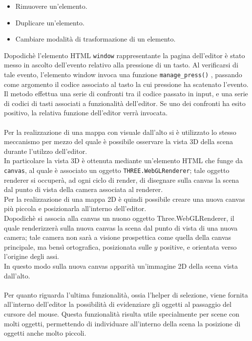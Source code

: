 \begin{itemize}
\item Rimuovere un’elemento.
\item Duplicare un’elemento.
\item Cambiare modalità di trasformazione di un elemento.
\end{itemize}
Dopodichè l’elemento HTML \texttt{window} rappresentante la pagina dell’editor è stato messo in ascolto dell’evento relativo alla pressione di un tasto. Al verificarsi di tale evento, l’elemento window invoca una funzione \texttt{manage\_press()} , passando come argomento il codice associato al tasto la cui pressione ha scatenato l’evento. Il metodo effettua una serie di confronti tra il codice passato in input, e una serie di codici di tasti associati a funzionalità dell’editor. Se uno dei confronti ha esito positivo, la relativa funzione dell’editor verrà invocata.
\\
\\
Per la realizzazione di una mappa con visuale dall’alto si è utilizzato lo stesso meccanismo per mezzo del quale è possibile osservare la vista 3D della scena durante l’utilzzo dell’editor.
\\
In particolare la vista 3D è ottenuta mediante un'elemento HTML che funge da \texttt{canvas}, al quale è associato un oggetto \texttt{THREE.WebGLRenderer}; tale oggetto renderer si occuperà, ad ogni ciclo di render, di disegnare sulla canvas la scena dal punto di vista della camera associata al renderer.
\\
Per la realizzazione di una mappa 2D è quindi possibile creare una nuova canvas più piccola e posizionarla all’interno dell’editor.
\\ 
Dopodichè si associa alla canvas un nuono oggetto Three.WebGLRenderer, il quale renderizzerà sulla nuova canvas la scena dal punto di vista di una nuova camera; tale camera non sarà a visione prospettica come quella della canvas principale, ma bensì ortografica, posizionata sulle $y$ positive, e orientata verso l’origine degli assi.
\\ 
In questo modo sulla nuova canvas apparità un’immagine 2D della scena vista dall’alto.
\\
\\
Per quanto riguarda l’ultima funzionalità, ossia l’helper di selezione, viene fornita all’interno dell’editor la possibilità di evidenziare gli oggetti al passaggio del cursore del mouse. Questa funzionalità risulta utile specialmente per scene con molti oggetti, permettendo di individuare all’interno della scena la posizione di oggetti anche molto piccoli.
